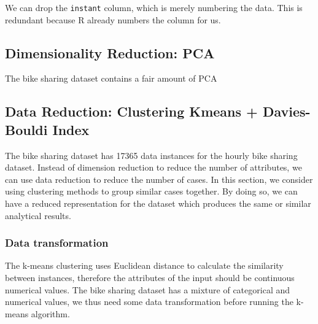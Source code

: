 \documentclass[12pt]{article}
\begin{document}
	We can drop the \texttt{instant} column, which is merely numbering the data. This is redundant because R already numbers the column for us. 
	
	\subsection{Dimensionality Reduction: PCA }
	\label{sec:dimension-reduction}
	
	The bike sharing dataset contains a fair amount of PCA
	
	\subsection{Data Reduction: Clustering Kmeans + Davies-Bouldi Index}
	\label{data-reduction}
	
	The bike sharing dataset has  17365 data instances for the hourly bike sharing dataset. Instead of dimension reduction to reduce the number of attributes, we can use data reduction to reduce the number of cases. In this section, we consider using clustering methods to group similar cases together. By doing so, we can have a reduced representation for the dataset which produces the same or similar analytical results.
	\subsubsection{Data transformation}
	The k-means clustering uses Euclidean distance to calculate the similarity between instances, therefore the attributes of the input should be continuous numerical values. The bike sharing dataset has a mixture of categorical and numerical values, we thus need some data transformation before running the k-means algorithm.
	
\end{document}
